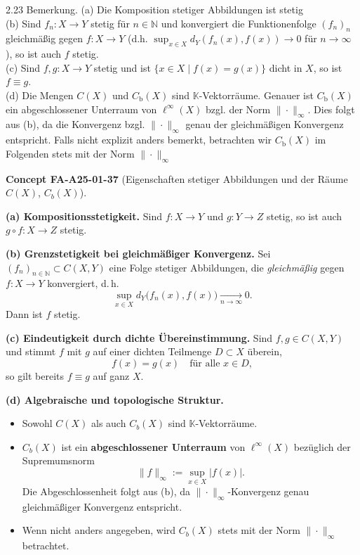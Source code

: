 \documentclass[10pt, letterpaper]{article}
\newcommand{\CustomHeading}[3]{%
  \par\medskip\noindent%
  \textbf{#1 #2} \textnormal{(#3)}.\enskip%
}
\newenvironment{CONC}[2]{\begin{unitbox}\CustomHeading{Concept}{#1}{#2}}{\end{unitbox}}
\begin{document}
2.23 Bemerkung. (a) Die Komposition stetiger Abbildungen ist stetig\\
(b) Sind $f_{n}: X \rightarrow Y$ stetig für $n \in \mathbb{N}$ und konvergiert die Funktionenfolge $\left(f_{n}\right)_{n}$ gleichmäßig gegen $f: X \rightarrow Y$ (d.h. $\sup _{x \in X} d_{Y}\left(f_{n}(x), f(x)\right) \rightarrow 0$ für $n \rightarrow \infty$ ), so ist auch $f$ stetig.\\
(c) Sind $f, g: X \rightarrow Y$ stetig und ist $\{x \in X \mid f(x)=g(x)\}$ dicht in $X$, so ist $f \equiv g$.\\
(d) Die Mengen $C(X)$ und $C_{\mathrm{b}}(X)$ sind $\mathbb{K}$-Vektorräume. Genauer ist $C_{\mathrm{b}}(X)$ ein abgeschlossener Unterraum von $\ell^{\infty}(X)$ bzgl. der Norm $\|\cdot\|_{\infty}$. Dies folgt aus (b), da die Konvergenz bzgl. $\|\cdot\|_{\infty}$ genau der gleichmäßigen Konvergenz entspricht. Falls nicht explizit anders bemerkt, betrachten wir $C_{\mathrm{b}}(X)$ im Folgenden stets mit der Norm $\|\cdot\|_{\infty}$\\



\begin{CONC}{FA-A25-01-37}{Eigenschaften stetiger Abbildungen und der Räume $C(X)$, $C_b(X)$}
\textbf{(a) Kompositionsstetigkeit.}  
Sind $f:X\to Y$ und $g:Y\to Z$ stetig, so ist auch $g\circ f:X\to Z$ stetig.

\smallskip
\textbf{(b) Grenzstetigkeit bei gleichmäßiger Konvergenz.}  
Sei $(f_n)_{n\in\mathbb{N}}\subset C(X,Y)$ eine Folge stetiger Abbildungen, die \emph{gleichmäßig} gegen $f:X\to Y$ konvergiert, d.\,h.
\[
\sup_{x\in X} d_Y\big(f_n(x),f(x)\big)\xrightarrow[n\to\infty]{}0.
\]
Dann ist $f$ stetig.

\smallskip
\textbf{(c) Eindeutigkeit durch dichte Übereinstimmung.}  
Sind $f,g\in C(X,Y)$ und stimmt $f$ mit $g$ auf einer dichten Teilmenge $D\subset X$ überein,
\[
f(x)=g(x)\quad\text{für alle }x\in D,
\]
so gilt bereits $f\equiv g$ auf ganz $X$.

\smallskip
\textbf{(d) Algebraische und topologische Struktur.}  
\begin{itemize}
\item Sowohl $C(X)$ als auch $C_b(X)$ sind $\mathbb{K}$-Vektorräume.
\item $C_b(X)$ ist ein \textbf{abgeschlossener Unterraum} von $\ell^{\infty}(X)$ bezüglich der Supremumsnorm
      \[
      \|f\|_{\infty}:=\sup_{x\in X}|f(x)|.
      \]
      Die Abgeschlossenheit folgt aus (b), da $\|\cdot\|_{\infty}$-Konvergenz genau gleichmäßiger Konvergenz entspricht.
\item Wenn nicht anders angegeben, wird $C_b(X)$ stets mit der Norm $\|\cdot\|_{\infty}$ betrachtet.
\end{itemize}
\end{CONC}
\end{document}
